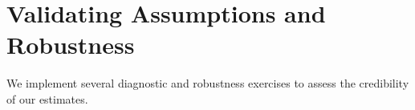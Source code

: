 \documentclass[a4paper,fleqn,longmktitle]{cas-sc}
\begin{document}

\section{Validating Assumptions and Robustness}
\label{subsec:robustness}

We implement several diagnostic and robustness exercises to assess the credibility of our estimates.
\end{document}
